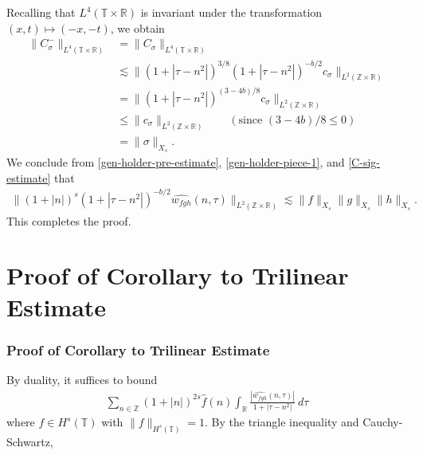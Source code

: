 \documentclass[handout]{beamer}
\numberwithin{equation}{section}
\newcommand{\rr}{\mathbb{R}}
\newcommand{\zz}{\mathbb{Z}}
\newcommand{\ci}{\mathbb{T}}
\newcommand{\wh}{\widehat}
\begin{document}
\begin{frame}
Recalling that $L^4(\ci \times \rr)$ is
invariant under the transformation $(x, 
t) \mapsto (-x,-t)$, we obtain
%
%
\begin{equation}
	\label{C-sig-estimate}
	\begin{split}
		\| C_\sigma^- \|_{L^4(\ci \times \rr)}
		& = \|C_\sigma \|_{L^4(\ci \times 
		\rr)} 
		\\
		& \lesssim \|\left( 1 + | \tau - n^{2 } | 
		\right)^{3/8} \left( 1 + | \tau - n^{2 } | 
		\right)^{-b/2} c_\sigma \|_{L^2(\zz \times \rr)}
		\\
		& = \|\left( 1 + | \tau - n^{2 } | 
		\right)^{(3 - 4b )/8 } c_\sigma \|_{L^2(\zz \times \rr)}
		\\
		& \le \|c_\sigma \|_{L^2(\zz \times \rr)}  \qquad (\text{since  } (3-4b)/8 \le 0 )
		\\
		& = \|\sigma\|_{X_s}.
	\end{split}
\end{equation}
%
%
We conclude from \eqref{gen-holder-pre-estimate}, \eqref{gen-holder-piece-1}, 
and \eqref{C-sig-estimate} that
%
%
%
\begin{equation*}
	\begin{split}
		\| \left ( 1 + |n | \right) ^s \left( 1 + | \tau - n^{2} | \right)^{-b/2} \wh{w_{fgh}} 
		(n, \tau) \|_{L^2(\zz \times \rr)} \lesssim 
		\|f\|_{X_s}\|g\|_{X_s}\|h\|_{X_s}.
	\end{split}
\end{equation*}
%
%
%
%
This completes the proof.  \qquad \qedsymbol
\end{frame}


\section{Proof of Corollary to Trilinear Estimate}
\begin{frame}
	\frametitle{Proof of Corollary to Trilinear Estimate}

By duality, it suffices to bound
%
\begin{equation*}
	\begin{split}
		\sum_{n \in \zz} \left(1 + |n| \right)^{2s} \wh{f}(n) \int_{\rr} \frac{|\wh{w_{fgh}}(n, \tau)|}{1 
		+ | \tau - n^{2 } |} \ d \tau
	\end{split}
\end{equation*}
%
where $f \in H^s(\ci)$ with $\|f\|_{H^s(\ci)} = 1$. By the triangle inequality 
and Cauchy-Schwartz,
\end{frame}
\end{document}
